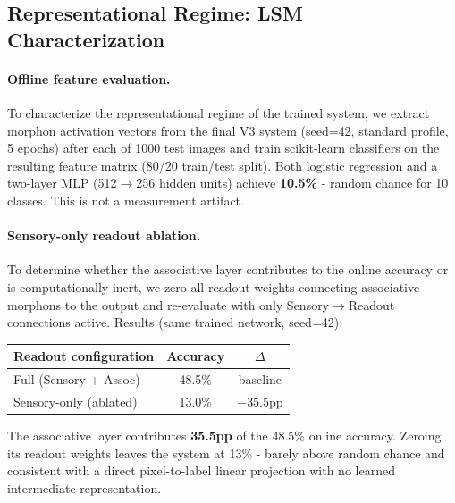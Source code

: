 \subsection{Representational Regime: LSM Characterization}
\label{sec:lsm_characterization}

\paragraph{Offline feature evaluation.}
To characterize the representational regime of the trained system, we extract morphon activation vectors from the final V3 system (seed=42, standard profile, 5 epochs) after each of 1000 test images and train scikit-learn classifiers on the resulting feature matrix (80/20 train/test split). Both logistic regression and a two-layer MLP (512$\to$256 hidden units) achieve \textbf{10.5\%} - random chance for 10 classes. This is not a measurement artifact.

\paragraph{Sensory-only readout ablation.}
To determine whether the associative layer contributes to the online accuracy or is computationally inert, we zero all readout weights connecting associative morphons to the output and re-evaluate with only Sensory$\to$Readout connections active. Results (same trained network, seed=42):

\begin{center}
\begin{tabular}{lcc}
\hline
Readout configuration & Accuracy & $\Delta$ \\
\hline
Full (Sensory + Assoc) & 48.5\% & baseline \\
Sensory-only (ablated) & 13.0\% & $-35.5$pp \\
\hline
\end{tabular}
\end{center}

The associative layer contributes \textbf{35.5pp} of the 48.5\% online accuracy. Zeroing its readout weights leaves the system at 13\% - barely above random chance and consistent with a direct pixel-to-label linear projection with no learned intermediate representation.

